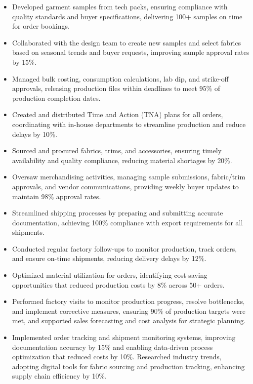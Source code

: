 \documentclass[10pt,letterpaper]{article}
\begin{document}
\begin{itemize}
\item Developed garment samples from tech packs, ensuring compliance with quality standards and buyer specifications, delivering 100+ samples on time for order bookings.
\item Collaborated with the design team to create new samples and select fabrics based on seasonal trends and buyer requests, improving sample approval rates by 15\%.
\item Managed bulk costing, consumption calculations, lab dip, and strike-off approvals, releasing production files within deadlines to meet 95\% of production completion dates.
\item Created and distributed Time and Action (TNA) plans for all orders, coordinating with in-house departments to streamline production and reduce delays by 10\%.
\item Sourced and procured fabrics, trims, and accessories, ensuring timely availability and quality compliance, reducing material shortages by 20\%.
\item Oversaw merchandising activities, managing sample submissions, fabric/trim approvals, and vendor communications, providing weekly buyer updates to maintain 98\% approval rates.
\item Streamlined shipping processes by preparing and submitting accurate documentation, achieving 100\% compliance with export requirements for all shipments.
\item Conducted regular factory follow-ups to monitor production, track orders, and ensure on-time shipments, reducing delivery delays by 12\%.
\item Optimized material utilization for orders, identifying cost-saving opportunities that reduced production costs by 8\% across 50+ orders.
\item Performed factory visits to monitor production progress, resolve bottlenecks, and implement corrective measures, ensuring 90\% of production targets were met, and supported sales forecasting and cost analysis for strategic planning.
\item Implemented order tracking and shipment monitoring systems, improving documentation accuracy by 15\% and enabling data-driven process optimization that reduced costs by 10\%. Researched industry trends, adopting digital tools for fabric sourcing and production tracking, enhancing supply chain efficiency by 10\%.
\end{itemize}
\end{document}
